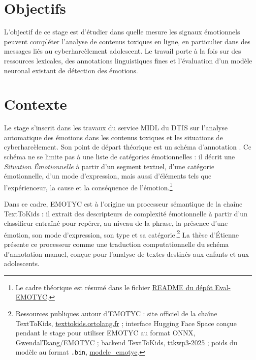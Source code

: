 



\maketitle


\section*{Objectifs}

L'objectif de ce stage est d'étudier dans quelle mesure les signaux émotionnels peuvent compléter l'analyse de contenus toxiques en ligne, en particulier dans des messages liés au cyberharcèlement adolescent. Le travail porte à la fois sur des ressources lexicales, des annotations linguistiques fines et l'évaluation d'un modèle neuronal existant de détection des émotions.




\section*{Contexte}

Le stage s'inscrit dans les travaux du service MIDL du DTIS sur l'analyse automatique des émotions dans les contenus toxiques et les situations de cyberharcèlement. Son point de départ théorique est un schéma d'annotation \citep{etienne2023analyse}. Ce schéma ne se limite pas à une liste de catégories émotionnelles : il décrit une \textit{Situation Émotionnelle} à partir d'un segment textuel, d'une catégorie émotionnelle, d'un mode d'expression, mais aussi d'éléments tels que l'expérienceur, la cause et la conséquence de l'émotion.\footnote{Le cadre théorique est résumé dans le fichier \href{https://github.com/GwenTsang/Eval-EMOTYC/blob/main/README.md}{README du dépôt Eval-EMOTYC}.}

Dans ce cadre, EMOTYC est à l'origine un processeur sémantique de la chaîne TextToKids : il extrait des descripteurs de complexité émotionnelle à partir d'un classifieur entraîné pour repérer, au niveau de la phrase, la présence d'une émotion, son mode d'expression, son type et sa catégorie.\footnote{Ressources publiques autour d'EMOTYC : site officiel de la chaîne TextToKids, \href{https://texttokids.ortolang.fr/}{texttokids.ortolang.fr} ; interface Hugging Face Space conçue pendant le stage pour utiliser EMOTYC au format ONNX, \href{https://huggingface.co/spaces/GwendalTsang/EMOTYC}{GwendalTsang/EMOTYC} ; backend TextToKids, \href{https://gitlab.huma-num.fr/texttokids/ttkwp3-2025}{ttkwp3-2025} ; poids du modèle au format \texttt{.bin}, \href{https://gitlab.huma-num.fr/texttokids/ttkwp3-2025/-/tree/main/text_complexity/server/src/resources/modele_emotyc/}{modele\_emotyc}.} La thèse d'Étienne présente ce processeur comme une traduction computationnelle du schéma d'annotation manuel, conçue pour l'analyse de textes destinés aux enfants et aux adolescents.

